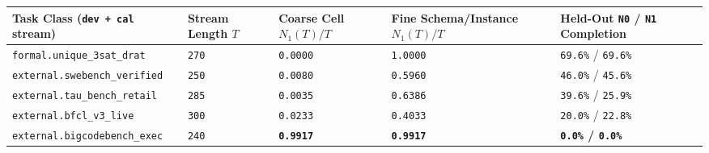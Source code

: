 \documentclass[10pt,letterpaper]{article}
\newcounter{none}
\begin{document}
{\def\LTcaptype{none} %
{\footnotesize\setlength{\tabcolsep}{3.8pt}\renewcommand{\arraystretch}{1.15}
\begin{longtable}[]{@{}
  >{\raggedright\arraybackslash}p{}
  >{\raggedleft\arraybackslash}p{}
  >{\raggedleft\arraybackslash}p{}
  >{\raggedleft\arraybackslash}p{}
  >{\raggedleft\arraybackslash}p{}@{}}
\toprule\noalign{}
\begin{minipage}[b]{\linewidth}\raggedright
\textbf{Task Class (\texttt{dev\ +\ cal} stream)}
\end{minipage} & \begin{minipage}[b]{\linewidth}\raggedleft
\textbf{Stream Length \(T\)}
\end{minipage} & \begin{minipage}[b]{\linewidth}\raggedleft
\textbf{Coarse Cell \(N_1(T)/T\)}
\end{minipage} & \begin{minipage}[b]{\linewidth}\raggedleft
\textbf{Fine Schema/Instance \(N_1(T)/T\)}
\end{minipage} & \begin{minipage}[b]{\linewidth}\raggedleft
\textbf{Held-Out \texttt{N0} / \texttt{N1} Completion}
\end{minipage} \\
\midrule\noalign{}
\endhead
\bottomrule\noalign{}
\endlastfoot
\texttt{formal.\allowbreak{}unique\_\allowbreak{}3sat\_\allowbreak{}drat} & \texttt{270} & \texttt{0.0000} &
\texttt{1.0000} & \texttt{69.6\%} / \texttt{69.6\%} \\
\texttt{external.\allowbreak{}swebench\_\allowbreak{}verified} & \texttt{250} & \texttt{0.0080} &
\texttt{0.5960} & \texttt{46.0\%} / \texttt{45.6\%} \\
\texttt{external.\allowbreak{}tau\_\allowbreak{}bench\_\allowbreak{}retail} & \texttt{285} & \texttt{0.0035} &
\texttt{0.6386} & \texttt{39.6\%} / \texttt{25.9\%} \\
\texttt{external.\allowbreak{}bfcl\_\allowbreak{}v3\_\allowbreak{}live} & \texttt{300} & \texttt{0.0233} &
\texttt{0.4033} & \texttt{20.0\%} / \texttt{22.8\%} \\
\texttt{external.\allowbreak{}bigcodebench\_\allowbreak{}exec} & \texttt{240} &
\textbf{\texttt{0.9917}} & \textbf{\texttt{0.9917}} &
\textbf{\texttt{0.0\%} / \texttt{0.0\%}} \\
\end{longtable}
}
}
\end{document}
